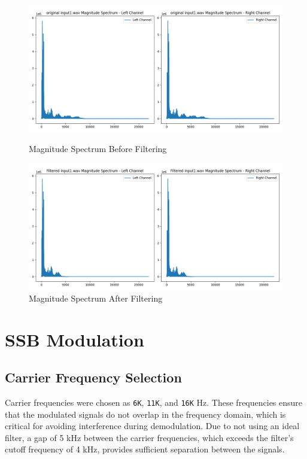 \documentclass[12pt,a4paper]{article}
\begin{document}
\begin{figure}[H]
    \centering
    \begin{minipage}{1\textwidth}
        \centering
        \includegraphics[width=\textwidth]{../data/input/magnitude_spectrum/original_input1.wav_magnitude_spectrum.png}
        \caption{Magnitude Spectrum Before Filtering}
    \end{minipage} \hfill
    \begin{minipage}{1\textwidth}
        \centering
        \includegraphics[width=\textwidth]{../data/filtered/magnitude_spectrum/filtered_input1.wav_magnitude_spectrum.png}
        \caption{Magnitude Spectrum After Filtering}
    \end{minipage}
\end{figure}

\newpage

\section{SSB Modulation}

\subsection{Carrier Frequency Selection}
Carrier frequencies were chosen as \texttt{6K}, \texttt{11K}, and \texttt{16K} Hz. These frequencies ensure that the modulated signals do not overlap in the frequency domain, which is critical for avoiding interference during demodulation.
Due to not using an ideal filter, a gap of 5 kHz between the carrier frequencies, which exceeds the filter’s cutoff frequency of 4 kHz, provides sufficient separation between the signals.
\end{document}

